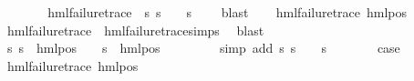 \begin{isabellebody}
\ \ \isamarkupfalse%
\ \isamarkupfalse%
\ {\isasympsi}\ \ {\isachardoublequoteopen}hml{\isacharunderscore}{\kern0pt}failure{\isacharunderscore}{\kern0pt}trace\ {\isasympsi}{\isachardoublequoteclose}\ {\isachardoublequoteopen}{\isacharparenleft}{\kern0pt}{\isasymforall}s{\isachardot}{\kern0pt}\ {\isacharparenleft}{\kern0pt}s\ {\isasymTurnstile}\ {\isasymphi}{\isacharparenright}{\kern0pt}\ {\isacharequal}{\kern0pt}\ {\isacharparenleft}{\kern0pt}s\ {\isasymTurnstile}\ {\isasympsi}{\isacharparenright}{\kern0pt}{\isacharparenright}{\kern0pt}{\isachardoublequoteclose}\ \isamarkupfalse%
\ blast\isanewline
\ \ \isamarkupfalse%
\ {\isachardoublequoteopen}hml{\isacharunderscore}{\kern0pt}failure{\isacharunderscore}{\kern0pt}trace\ {\isacharparenleft}{\kern0pt}hml{\isacharunderscore}{\kern0pt}pos\ {\isasymalpha}\ {\isasympsi}{\isacharparenright}{\kern0pt}{\isachardoublequoteclose}\ \isanewline
\ \ \ \ \isamarkupfalse%
\ {\isacartoucheopen}hml{\isacharunderscore}{\kern0pt}failure{\isacharunderscore}{\kern0pt}trace\ {\isasympsi}{\isacartoucheclose}\ hml{\isacharunderscore}{\kern0pt}failure{\isacharunderscore}{\kern0pt}trace{\isachardot}{\kern0pt}simps\ \isamarkupfalse%
\ blast\isanewline
\ \ \isamarkupfalse%
\ {\isachardoublequoteopen}{\isacharparenleft}{\kern0pt}{\isasymforall}s{\isachardot}{\kern0pt}\ {\isacharparenleft}{\kern0pt}s\ {\isasymTurnstile}\ hml{\isacharunderscore}{\kern0pt}pos\ {\isasymalpha}\ {\isasymphi}{\isacharparenright}{\kern0pt}\ {\isacharequal}{\kern0pt}\ {\isacharparenleft}{\kern0pt}s\ {\isasymTurnstile}\ {\isacharparenleft}{\kern0pt}hml{\isacharunderscore}{\kern0pt}pos\ {\isasymalpha}\ {\isasympsi}{\isacharparenright}{\kern0pt}{\isacharparenright}{\kern0pt}{\isacharparenright}{\kern0pt}{\isachardoublequoteclose}\ \isanewline
\ \ \ \ \isamarkupfalse%
\ {\isacharparenleft}{\kern0pt}simp\ add{\isacharcolon}{\kern0pt}\ {\isacartoucheopen}{\isasymforall}s{\isachardot}{\kern0pt}\ {\isacharparenleft}{\kern0pt}s\ {\isasymTurnstile}\ {\isasymphi}{\isacharparenright}{\kern0pt}\ {\isacharequal}{\kern0pt}\ {\isacharparenleft}{\kern0pt}s\ {\isasymTurnstile}\ {\isasympsi}{\isacharparenright}{\kern0pt}{\isacartoucheclose}{\isacharparenright}{\kern0pt}\isanewline
\ \ \isamarkupfalse%
\ \isamarkupfalse%
\ {\isacharquery}{\kern0pt}case\ \isanewline
\ \ \ \ \isamarkupfalse%
\ {\isacartoucheopen}hml{\isacharunderscore}{\kern0pt}failure{\isacharunderscore}{\kern0pt}trace\ {\isacharparenleft}{\kern0pt}hml{\isacharunderscore}{\kern0pt}pos\ {\isasymalpha}\ {\isasympsi}{\isacharparenright}{\kern0pt}{\isacartoucheclose}\ \isamarkupfalse%

\end{isabellebody}
